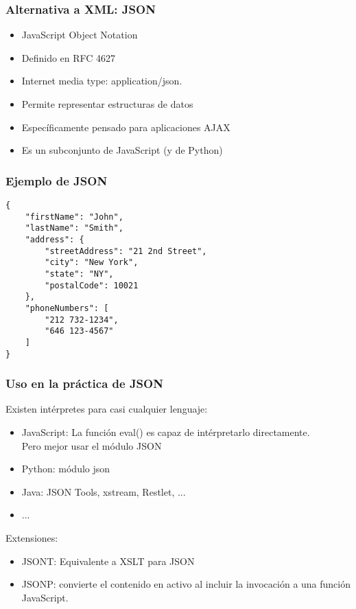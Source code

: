 
\begin{frame}
\frametitle{Alternativa a XML: JSON}

\begin{itemize}
\item JavaScript Object Notation
\item Definido en RFC 4627
\item Internet media type: application/json.
\item Permite representar estructuras de datos
\item Específicamente pensado para aplicaciones AJAX
\item Es un subconjunto de JavaScript (y de Python)
\end{itemize}
\end{frame}


\begin{frame}[fragile]
\frametitle{Ejemplo de JSON}

\begin{verbatim}
{
    "firstName": "John",
    "lastName": "Smith",
    "address": {
        "streetAddress": "21 2nd Street",
        "city": "New York",
        "state": "NY",
        "postalCode": 10021
    },
    "phoneNumbers": [
        "212 732-1234",
        "646 123-4567"
    ]
}
\end{verbatim}

\end{frame}


\begin{frame}
\frametitle{Uso en la práctica de JSON}

Existen intérpretes para casi cualquier lenguaje:
\begin{itemize}
\item JavaScript: La función eval() es capaz de intérpretarlo directamente. \\
  Pero mejor usar el módulo JSON
\item Python: módulo json
\item Java: JSON Tools, xstream, Restlet, ...
\item   ...
\end{itemize}

Extensiones:
\begin{itemize}
\item JSONT: Equivalente a XSLT para JSON
\item JSONP: convierte el contenido en activo al incluir la invocación a una función JavaScript.
\end{itemize}
\end{frame}


